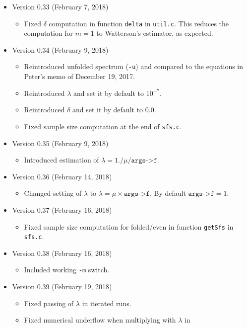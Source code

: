 \documentclass[a4paper]{article}
\newcommand{\ty}{\texttt}
\begin{document}
\begin{itemize}
\item Version 0.33 (February 7, 2018)
  \begin{itemize}
    \item Fixed $\delta$ computation in function \ty{delta} in
      \ty{util.c}. This reduces the computation for $m=1$ to
      Watterson's estimator, as expected.
  \end{itemize}
\item Version 0.34 (February 9, 2018)
  \begin{itemize}
    \item Reintroduced unfolded spectrum (\ty{-u}) and compared to the equations
      in Peter's memo of December 19, 2017.
    \item Reintroduced $\lambda$ and set it by default to $10^{-7}$.
    \item Reintroduced $\delta$ and set it by default to $0.0$.
    \item Fixed sample size computation at the end of \ty{sfs.c}.
  \end{itemize}
\item Version 0.35 (February 9, 2018)
  \begin{itemize}
  \item Introduced estimation of $\lambda=1./\mu/\texttt{args->f}$.
  \end{itemize}
\item Version 0.36 (February 14, 2018)
  \begin{itemize}
    \item Changed setting of $\lambda$ to
      $\lambda=\mu\times\texttt{args->f}$. By default
      $\texttt{args->f}=1$.
  \end{itemize}
\item Version 0.37 (February 16, 2018)
  \begin{itemize}
    \item Fixed sample size computation for folded/even in function
      \ty{getSfs} in \ty{sfs.c}.
  \end{itemize}
\item Version 0.38 (February 16, 2018)
  \begin{itemize}
  \item Included working \ty{-m} switch.
  \end{itemize}
\item Version 0.39 (February 19, 2018)
  \begin{itemize}
  \item Fixed passing of $\lambda$ in iterated runs.
  \item Fixed numerical underflow when multiplying with $\lambda$ in

\end{itemize}
\end{itemize}
\end{document}
